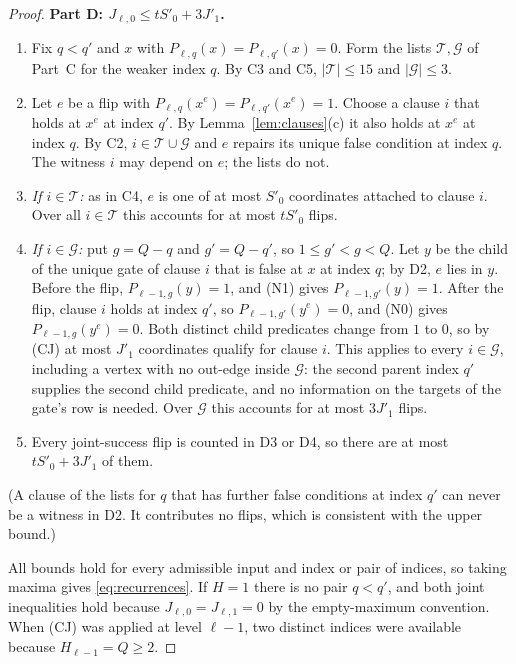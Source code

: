 \documentclass[11pt]{article}
\theoremstyle{definition}
\theoremstyle{remark}
\begin{document}
\begin{proof}
\medskip\noindent\textbf{Part D: \(J_{\ell,0}\le tS'_0+3J'_1\).}
\begin{enumerate}[label=\textbf{D\arabic*.},leftmargin=*]
\item Fix \(q<q'\) and \(x\) with \(P_{\ell,q}(x)=P_{\ell,q'}(x)=0\). Form the lists \(\mathcal T,\mathcal G\) of Part~C for the weaker index \(q\). By C3 and C5, \(|\mathcal T|\le15\) and \(|\mathcal G|\le3\).
\item Let \(e\) be a flip with \(P_{\ell,q}(x^e)=P_{\ell,q'}(x^e)=1\). Choose a clause \(i\) that holds at \(x^e\) at index \(q'\). By Lemma~\ref{lem:clauses}(c) it also holds at \(x^e\) at index \(q\). By C2, \(i\in\mathcal T\cup\mathcal G\) and \(e\) repairs its unique false condition at index \(q\). The witness \(i\) may depend on \(e\); the lists do not.
\item \emph{If \(i\in\mathcal T\):} as in C4, \(e\) is one of at most \(S'_0\) coordinates attached to clause \(i\). Over all \(i\in\mathcal T\) this accounts for at most \(tS'_0\) flips.
\item \emph{If \(i\in\mathcal G\):} put \(g=Q-q\) and \(g'=Q-q'\), so \(1\le g'<g<Q\). Let \(y\) be the child of the unique gate of clause \(i\) that is false at \(x\) at index \(q\); by D2, \(e\) lies in \(y\). Before the flip, \(P_{\ell-1,g}(y)=1\), and (N1) gives \(P_{\ell-1,g'}(y)=1\). After the flip, clause \(i\) holds at index \(q'\), so \(P_{\ell-1,g'}(y^e)=0\), and (N0) gives \(P_{\ell-1,g}(y^e)=0\). Both distinct child predicates change from \(1\) to \(0\), so by (CJ) at most \(J'_1\) coordinates qualify for clause \(i\). This applies to every \(i\in\mathcal G\), including a vertex with no out-edge inside \(\mathcal G\): the second parent index \(q'\) supplies the second child predicate, and no information on the targets of the gate's row is needed. Over \(\mathcal G\) this accounts for at most \(3J'_1\) flips.
\item Every joint-success flip is counted in D3 or D4, so there are at most \(tS'_0+3J'_1\) of them.
\end{enumerate}
(A clause of the lists for \(q\) that has further false conditions at index \(q'\) can never be a witness in D2. It contributes no flips, which is consistent with the upper bound.)

\medskip
All bounds hold for every admissible input and index or pair of indices, so taking maxima gives \eqref{eq:recurrences}.
If \(H=1\) there is no pair \(q<q'\), and both joint inequalities hold because \(J_{\ell,0}=J_{\ell,1}=0\) by the empty-maximum convention.
When (CJ) was applied at level \(\ell-1\), two distinct indices were available because \(H_{\ell-1}=Q\ge2\).
\end{proof}
\end{document}
